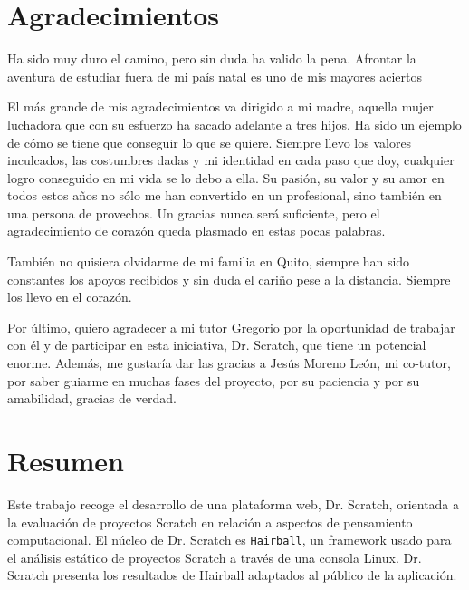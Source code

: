 \documentclass[a4paper, 12pt]{book}
\begin{document}

\chapter*{Agradecimientos}

Ha sido muy duro el camino, pero sin duda ha valido la pena. Afrontar la aventura de
estudiar fuera de mi país natal es uno de mis mayores aciertos

El más grande de mis agradecimientos va dirigido a mi madre, aquella mujer luchadora que
con su esfuerzo ha sacado adelante a tres hijos. Ha sido un ejemplo de cómo se tiene que
conseguir lo que se quiere. Siempre llevo los valores inculcados, las costumbres dadas y
mi identidad en cada paso que doy, cualquier logro conseguido en mi vida se lo debo a ella.
Su pasión, su valor y su amor en todos estos años no sólo me han convertido en un profesional,
sino también en una persona de provechos. Un gracias nunca será suficiente, pero el
agradecimiento de corazón queda plasmado en estas pocas palabras.

También no quisiera olvidarme de mi familia en Quito, siempre han sido constantes los apoyos
recibidos y sin duda el cariño pese a la distancia. Siempre los llevo en el corazón.

Por último, quiero agradecer a mi tutor Gregorio por la oportunidad de trabajar con él y
de participar en esta iniciativa, Dr. Scratch, que tiene un potencial enorme. Además, 
me gustaría dar las gracias a Jesús Moreno León, mi co-tutor, por saber guiarme en muchas
fases del proyecto, por su paciencia y por su amabilidad, gracias de verdad.


\chapter*{Resumen}


Este trabajo recoge el desarrollo de una plataforma web, Dr. Scratch, orientada a la 
evaluación de proyectos Scratch en relación a aspectos de pensamiento computacional. 
El núcleo de Dr. Scratch es \texttt{Hairball}, un framework usado para el análisis estático de 
proyectos Scratch a través de una consola Linux. Dr. Scratch presenta los resultados
de Hairball adaptados al público de la aplicación.
\end{document}
